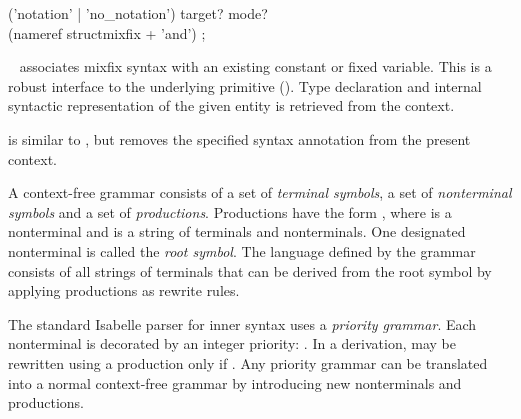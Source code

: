 \begin{isabellebody}
\begin{isamarkuptext}
  \begin{rail}
    ('notation' | 'no\_notation') target? mode? \\ (nameref structmixfix + 'and')
    ;
  \end{rail}

  \begin{description}

  \item \hyperlink{command.notation}{\mbox{}}~ associates mixfix
  syntax with an existing constant or fixed variable.  This is a
  robust interface to the underlying \hyperlink{command.syntax}{\mbox{}} primitive
  ().  Type declaration and internal syntactic
  representation of the given entity is retrieved from the context.
  
  \item \hyperlink{command.no-notation}{\mbox{}} is similar to \hyperlink{command.notation}{\mbox{}},
  but removes the specified syntax annotation from the present
  context.

  \end{description}%
\end{isamarkuptext}%
\isamarkuptrue%
%
\isamarkuptrue%
%
\isamarkuptrue%
%
\begin{isamarkuptext}%
A context-free grammar consists of a set of \emph{terminal
  symbols}, a set of \emph{nonterminal symbols} and a set of
  \emph{productions}.  Productions have the form ,
  where  is a nonterminal and \isa{{\isasymgamma}} is a string of
  terminals and nonterminals.  One designated nonterminal is called
  the \emph{root symbol}.  The language defined by the grammar
  consists of all strings of terminals that can be derived from the
  root symbol by applying productions as rewrite rules.

  The standard Isabelle parser for inner syntax uses a \emph{priority
  grammar}.  Each nonterminal is decorated by an integer priority:
  .  In a derivation,  may be rewritten
  using a production  only if .  Any
  priority grammar can be translated into a normal context-free
  grammar by introducing new nonterminals and productions.


\end{isamarkuptext}
\end{isabellebody}
